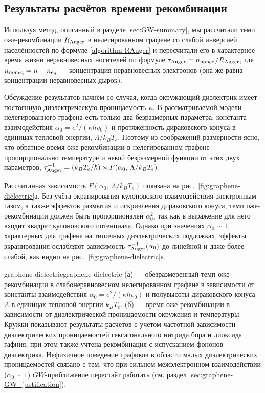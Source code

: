 \subsection{Результаты расчётов времени рекомбинации} \label{sec:graphene-recombination-time}
Используя метод, описанный в разделе \ref{sec:GW-summary}, мы рассчитали темп оже-рекомбинации $R_{\rm Auger}$ в нелегированном графене со слабой инверсией населённостей по формуле \eqref{algorithm-RAuger} и пересчитали его в характерное время жизни неравновесных носителей по формуле $\tau_{\rm Auger} = n_{\rm noneq}/R_{\rm Auger}$, где $n_{\rm noneq} = n - n_{\rm eq}$ --- концентрация неравновесных электронов (она же равна концентрации неравновесных дырок).

Обсуждение результатов начнём со случая, когда окружающий диэлектрик имеет постоянную диэлектрическую проницаемость $\kappa$. В рассматриваемой модели нелегированного графена есть только два безразмерных параметра: константа взаимодействия $\alpha_0 = e^2/(\kappa \hbar v_0)$ и протяжённость дираковского конуса в единицах тепловой энергии, $\Lambda/k_B T_e$. Поэтому из соображений размерности ясно, что обратное время оже-рекомбинации в нелегированном графене пропорционально температуре и некой безразмерной функции от этих двух параметров, $\tau^{-1}_{\rm Auger} = (k_B T_e/\hbar)\times F(\alpha_0,\, \Lambda/k_B T_e)$.

Рассчитанная зависимость $F(\alpha_0,\, \Lambda/k_B T_e)$ показана на рис.~\ref{fig:graphene-dielectric}а. Без учёта экранирования кулоновского взаимодействия электронным газом, а также эффектов размытия и искривления дираковского конуса, темп оже-рекомбинации должен быть пропорционален $\alpha_0^2$, так как в выражение для него входит квадрат кулоновского потенциала. Однако при значениях $\alpha_0 \sim 1$, характерных для графена на типичных диэлектрических подложках, эффекты экранирования ослабляют зависимость $\tau^{-1}_{\rm Auger}(\alpha_0)$ до линейной и даже более слабой, как видно на  рис.~\ref{fig:graphene-dielectric}а.

\begin{fig}{graphene-dielectric}{graphene-dielectric}
(а) --- обезразмеренный темп оже-рекомбинации в слабонеравновесном нелегированном графене в зависимости от константы взаимодействия $\alpha_0 = e^2/(\kappa \hbar v_0)$ и полувысоты дираковского конуса $\Lambda$ в единицах тепловой энергии $k_B T_e$. (б) --- время оже-рекомбинации в зависимости от диэлектрической проницаемости окружения и температуры. Кружки показывают результаты расчётов с учётом частотной зависимости диэлектрических проницаемостей гексагонального нитрида бора и диоксида гафния, при этом также учтена рекомбинация с испусканием фононов диэлектрика. Нефизичное поведение графиков в области малых диэлектрических проницаемостей связано с тем, что при сильном межэлектронном взаимодействии ($\alpha_0 \sim 1$) $GW$-приближение перестаёт работать (см. раздел \ref{sec:graphene-GW_justification}).
\end{fig}

